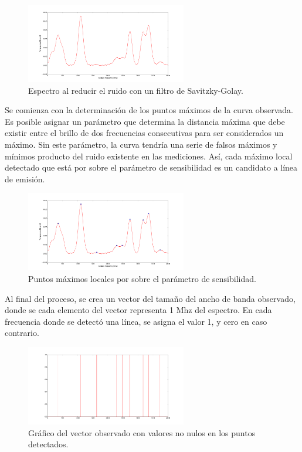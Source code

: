 \documentclass[twocolumn, draft]{emulateapj}
\begin{document}
\begin{figure}[H]
	\begin{center}
		\includegraphics[width=70mm]{images/fig3}
		\caption{Espectro al reducir el ruido con un filtro de Savitzky-Golay. }
	\end{center}
\end{figure}


Se comienza con la determinación de los puntos máximos de la curva observada. Es posible asignar un parámetro que determina la distancia máxima que debe existir entre el brillo de dos frecuencias consecutivas para ser considerados un máximo. Sin este parámetro, la curva tendría una serie de falsos máximos y mínimos producto del ruido existente en las mediciones. Así, cada máximo local detectado que está por sobre el parámetro de sensibilidad es un candidato a línea de emisión.

\begin{figure}[H]
	\begin{center}
		\includegraphics[width=70mm]{images/fig4}
		\caption{Puntos máximos locales por sobre el parámetro de sensibilidad. }
	\end{center}
\end{figure}

Al final del proceso, se crea un vector del tamaño del ancho de banda observado, donde se cada elemento del vector representa 1 Mhz del espectro. En cada frecuencia donde se detectó una línea, se asigna el valor 1, y cero en caso contrario.

\begin{figure}[H]
	\begin{center}
		\includegraphics[width=70mm]{images/fig5}
		\caption{Gráfico del vector observado con valores no nulos en los puntos detectados. }
	\end{center}
\end{figure}
\end{document}

